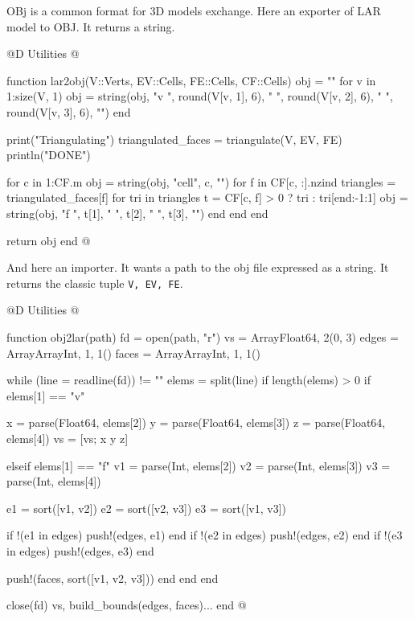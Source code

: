 OBj is a common format for 3D models exchange. 
Here an exporter of LAR model to OBJ. It returns a string.

@D Utilities
@{function lar2obj(V::Verts, EV::Cells, FE::Cells, CF::Cells)
    obj = ""
    for v in 1:size(V, 1)
        obj = string(obj, "v ", round(V[v, 1], 6), " ", round(V[v, 2], 6), " ", round(V[v, 3], 6), "\n")
    end

    print("Triangulating")
    triangulated_faces = triangulate(V, EV, FE)
    println("DONE")

    for c in 1:CF.m
    obj = string(obj, "\ng cell", c, "\n")
    for f in CF[c, :].nzind
        triangles = triangulated_faces[f]
        for tri in triangles
            t = CF[c, f] > 0 ? tri : tri[end:-1:1]
            obj = string(obj, "f ", t[1], " ", t[2], " ", t[3], "\n")
        end
    end
end

    return obj
end
@}

And here an importer. It wants a path to the obj file
expressed as a string. It returns the classic tuple \texttt{V, EV, FE}.

@D Utilities
@{function obj2lar(path)
    fd = open(path, "r")
    vs = Array{Float64, 2}(0, 3)
    edges = Array{Array{Int, 1}, 1}()
    faces = Array{Array{Int, 1}, 1}()

    while (line = readline(fd)) != ""
        elems = split(line)
        if length(elems) > 0
            if elems[1] == "v"

                x = parse(Float64, elems[2])
                y = parse(Float64, elems[3])
                z = parse(Float64, elems[4])
                vs = [vs; x y z]

            elseif elems[1] == "f"
                v1 = parse(Int, elems[2])
                v2 = parse(Int, elems[3])
                v3 = parse(Int, elems[4])

                e1 = sort([v1, v2])
                e2 = sort([v2, v3])
                e3 = sort([v1, v3])

                if !(e1 in edges)
                    push!(edges, e1)
                end
                if !(e2 in edges)
                    push!(edges, e2)
                end
                if !(e3 in edges)
                    push!(edges, e3)
                end

                push!(faces, sort([v1, v2, v3]))
            end
        end
    end

    close(fd)
    vs, build_bounds(edges, faces)...
end  
@}


